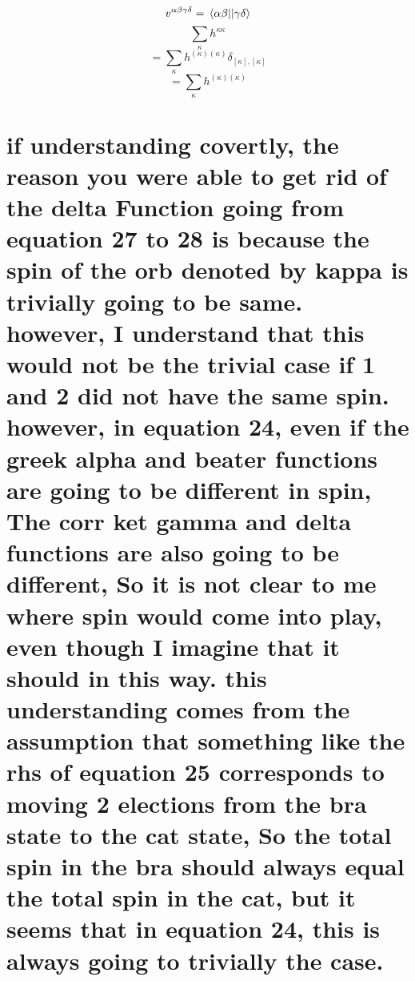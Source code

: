 \documentclass[12pt]{article}
\begin{document}
\begin{equation}
    v^{\alpha \beta \gamma  \delta }=\mel{\alpha \beta }{}{\gamma \delta }
\end{equation}
\begin{equation}
    \sum_{\kappa } h^{\kappa \kappa }
\end{equation}
\begin{equation}
    =\sum_{\kappa } h^{(\kappa )(\kappa )}\delta _{[\kappa ],[\kappa ]}
\end{equation}
\begin{equation}
    =\sum_{\kappa } h^{(\kappa )(\kappa )}
\end{equation}
\section{if understanding covertly, the reason you were able to get rid of the delta Function going from equation 27 to 28 is because the spin of the orb denoted by kappa is trivially going to be same. however, I understand that this would not be the trivial case if 1 and 2 did not have the same spin. however, in equation 24, even if the greek alpha and beater functions are going to be different in spin, The corr ket gamma and delta functions are also going to be different, So it is not clear to me where spin would come into play, even though I imagine that it should in this way. this understanding comes from the assumption that something like the rhs of equation 25 corresponds to moving 2 elections from the bra state to the cat state, So the total spin in the bra should always equal the total spin in the cat, but it seems that in equation 24, this is always going to trivially the case.}
\end{document}
